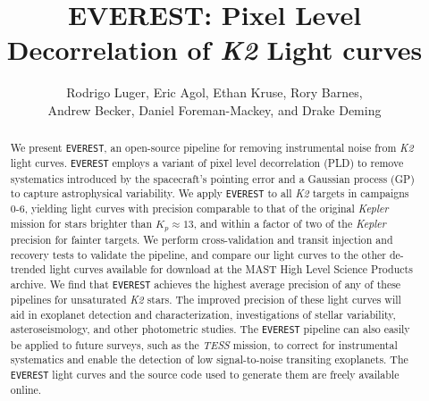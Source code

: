 \documentclass[]{emulateapj}
\begin{document}
\title{EVEREST: Pixel Level Decorrelation of \emph{K2} Light curves}

\author{Rodrigo Luger, Eric Agol, Ethan Kruse, Rory Barnes,\\
Andrew Becker, Daniel Foreman-Mackey, and Drake Deming}
\begin{abstract}
We present \texttt{EVEREST}, an open-source pipeline for removing instrumental noise
from \emph{K2} light curves. \texttt{EVEREST} employs a variant of pixel level decorrelation (PLD) 
to remove systematics introduced by the spacecraft's 
pointing error and a Gaussian process (GP) to capture astrophysical variability. We
apply \texttt{EVEREST} to all \emph{K2} targets in campaigns 0-6, yielding light curves
with precision comparable to that of the original \emph{Kepler} mission for stars brighter
than $K_p \approx 13$, and within a factor of two of the \emph{Kepler} precision for fainter
targets. We perform cross-validation and transit injection and recovery tests to validate
the pipeline, and compare our light curves to the other de-trended light curves available
for download at the MAST High Level Science Products archive. We find that 
\texttt{EVEREST} achieves the highest average precision of any of these pipelines for 
unsaturated \emph{K2} stars. The improved precision of these
light curves will aid in exoplanet detection and characterization, investigations of stellar
variability, asteroseismology, and other photometric studies. The \texttt{EVEREST} pipeline can
also easily be applied to future surveys, such as the \emph{TESS} mission, to
correct for instrumental systematics and enable the detection of low signal-to-noise transiting
exoplanets. The \texttt{EVEREST} light curves and the source code
used to generate them are freely available online.
\end{abstract}
\end{document}
